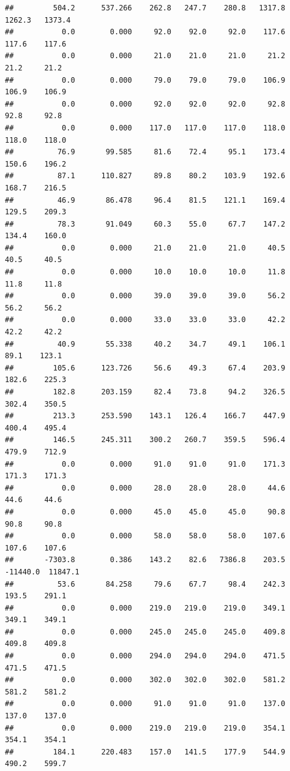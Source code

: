 \documentclass[
]{article}
\begin{document}
\begin{verbatim}
##         504.2      537.266    262.8   247.7    280.8   1317.8   1262.3   1373.4
##           0.0        0.000     92.0    92.0     92.0    117.6    117.6    117.6
##           0.0        0.000     21.0    21.0     21.0     21.2     21.2     21.2
##           0.0        0.000     79.0    79.0     79.0    106.9    106.9    106.9
##           0.0        0.000     92.0    92.0     92.0     92.8     92.8     92.8
##           0.0        0.000    117.0   117.0    117.0    118.0    118.0    118.0
##          76.9       99.585     81.6    72.4     95.1    173.4    150.6    196.2
##          87.1      110.827     89.8    80.2    103.9    192.6    168.7    216.5
##          46.9       86.478     96.4    81.5    121.1    169.4    129.5    209.3
##          78.3       91.049     60.3    55.0     67.7    147.2    134.4    160.0
##           0.0        0.000     21.0    21.0     21.0     40.5     40.5     40.5
##           0.0        0.000     10.0    10.0     10.0     11.8     11.8     11.8
##           0.0        0.000     39.0    39.0     39.0     56.2     56.2     56.2
##           0.0        0.000     33.0    33.0     33.0     42.2     42.2     42.2
##          40.9       55.338     40.2    34.7     49.1    106.1     89.1    123.1
##         105.6      123.726     56.6    49.3     67.4    203.9    182.6    225.3
##         182.8      203.159     82.4    73.8     94.2    326.5    302.4    350.5
##         213.3      253.590    143.1   126.4    166.7    447.9    400.4    495.4
##         146.5      245.311    300.2   260.7    359.5    596.4    479.9    712.9
##           0.0        0.000     91.0    91.0     91.0    171.3    171.3    171.3
##           0.0        0.000     28.0    28.0     28.0     44.6     44.6     44.6
##           0.0        0.000     45.0    45.0     45.0     90.8     90.8     90.8
##           0.0        0.000     58.0    58.0     58.0    107.6    107.6    107.6
##       -7303.8        0.386    143.2    82.6   7386.8    203.5 -11440.0  11847.1
##          53.6       84.258     79.6    67.7     98.4    242.3    193.5    291.1
##           0.0        0.000    219.0   219.0    219.0    349.1    349.1    349.1
##           0.0        0.000    245.0   245.0    245.0    409.8    409.8    409.8
##           0.0        0.000    294.0   294.0    294.0    471.5    471.5    471.5
##           0.0        0.000    302.0   302.0    302.0    581.2    581.2    581.2
##           0.0        0.000     91.0    91.0     91.0    137.0    137.0    137.0
##           0.0        0.000    219.0   219.0    219.0    354.1    354.1    354.1
##         184.1      220.483    157.0   141.5    177.9    544.9    490.2    599.7

\end{verbatim}
\end{document}
